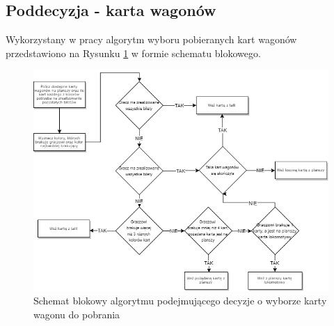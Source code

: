 \documentclass[12pt, oneside]{report}
\begin{document}
\subsection{Poddecyzja - karta wagonów}
Wykorzystany w pracy algorytm wyboru pobieranych kart wagonów przedstawiono na Rysunku \ref{figure:wagons_diagram} w formie schematu blokowego.
\begin{figure}[h]
	\centering
	\includegraphics[height=0.6\textheight]{Wagon_card.png}
	\caption{Schemat blokowy algorytmu podejmującego decyzje o wyborze karty wagonu do pobrania}
	\label{figure:wagons_diagram}
\end{figure}
\end{document}
